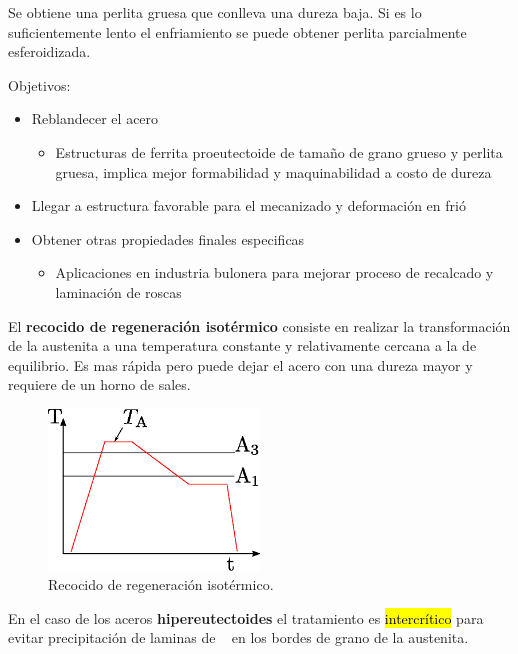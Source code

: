 Se obtiene una perlita gruesa que conlleva una dureza baja. Si es lo suficientemente lento el enfriamiento se puede obtener perlita parcialmente esferoidizada.

Objetivos:
\begin{itemize}
    \item Reblandecer el acero
    \begin{itemize}
        \item Estructuras de ferrita proeutectoide de tamaño de grano grueso y perlita gruesa, implica mejor formabilidad y maquinabilidad a costo de dureza
    \end{itemize}
    \item Llegar a estructura favorable para el mecanizado y deformación en frió
    \item Obtener otras propiedades finales especificas
    \begin{itemize}
        \item Aplicaciones en industria bulonera para mejorar proceso de recalcado y laminación de roscas
    \end{itemize}
\end{itemize}

El \textbf{recocido de regeneración isotérmico} consiste en realizar la transformación de la austenita a una temperatura constante y relativamente cercana a la de equilibrio. Es mas rápida pero puede dejar el acero con una dureza mayor y requiere de un horno de sales.

\begin{figure}[htb!]
    \centering
    \includegraphics[width=0.5\textwidth]{fig/TTrecoregiso.eps}
    \caption{Recocido de regeneración isotérmico.}
    \label{fig:TTTrecocidoregeneracionisotermico}
\end{figure}

En el caso de los aceros \textbf{hipereutectoides} el tratamiento es \hl{intercrítico} para evitar precipitación de laminas de \cementita~ en los bordes de grano de la austenita.

